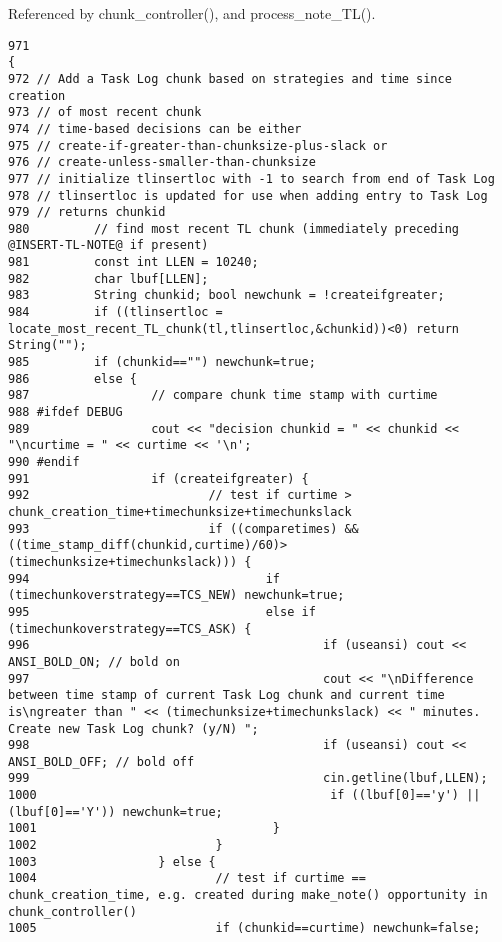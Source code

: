 Referenced by chunk\_\-controller(), and process\_\-note\_\-TL().



\footnotesize\begin{verbatim}971                                                                                                            {
972 // Add a Task Log chunk based on strategies and time since creation
973 // of most recent chunk
974 // time-based decisions can be either
975 // create-if-greater-than-chunksize-plus-slack or
976 // create-unless-smaller-than-chunksize
977 // initialize tlinsertloc with -1 to search from end of Task Log
978 // tlinsertloc is updated for use when adding entry to Task Log
979 // returns chunkid
980         // find most recent TL chunk (immediately preceding @INSERT-TL-NOTE@ if present)
981         const int LLEN = 10240;
982         char lbuf[LLEN];
983         String chunkid; bool newchunk = !createifgreater;
984         if ((tlinsertloc = locate_most_recent_TL_chunk(tl,tlinsertloc,&chunkid))<0) return String("");
985         if (chunkid=="") newchunk=true;
986         else {
987                 // compare chunk time stamp with curtime
988 #ifdef DEBUG
989                 cout << "decision chunkid = " << chunkid << "\ncurtime = " << curtime << '\n';
990 #endif
991                 if (createifgreater) {
992                         // test if curtime > chunk_creation_time+timechunksize+timechunkslack
993                         if ((comparetimes) && ((time_stamp_diff(chunkid,curtime)/60)>(timechunksize+timechunkslack))) {
994                                 if (timechunkoverstrategy==TCS_NEW) newchunk=true;
995                                 else if (timechunkoverstrategy==TCS_ASK) {
996                                         if (useansi) cout << ANSI_BOLD_ON; // bold on
997                                         cout << "\nDifference between time stamp of current Task Log chunk and current time is\ngreater than " << (timechunksize+timechunkslack) << " minutes. Create new Task Log chunk? (y/N) ";
998                                         if (useansi) cout << ANSI_BOLD_OFF; // bold off
999                                         cin.getline(lbuf,LLEN);
1000                                         if ((lbuf[0]=='y') || (lbuf[0]=='Y')) newchunk=true;
1001                                 }
1002                         }
1003                 } else {
1004                         // test if curtime == chunk_creation_time, e.g. created during make_note() opportunity in chunk_controller()
1005                         if (chunkid==curtime) newchunk=false;

\end{verbatim}
